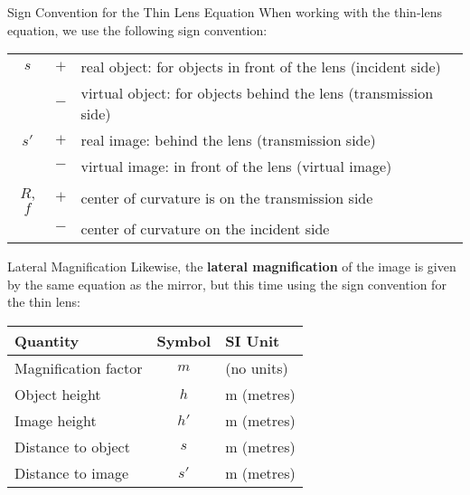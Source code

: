 \documentclass[12pt,compress,aspectratio=169]{beamer}
\newcommand{\eq}[2]{\vspace{#1}{\LARGE\begin{displaymath}#2\end{displaymath}}}
\begin{document}
\begin{frame}{Sign Convention for the Thin Lens Equation}
  When working with the thin-lens equation, we use the following sign
  convention:
  
  \eq{-.2in}{
    \boxed{\frac{1}{s}+\frac{1}{s'}=\frac{1}{f}}
  }
  \begin{center}
    \begin{tabular}{ccl}
      \hline
      $s$ & $+$ & real object: for objects in front of the lens (incident
      side) \\
      & $-$ & virtual object: for objects behind the lens (transmission side)
      \\\hline
      $s'$ & $+$ & real image: behind the lens (transmission side)\\
      & $-$ & virtual image: in front of the lens (virtual image)\\\hline
      $R$, $f$ & $+$ & center of curvature is on the transmission side\\
      & $-$ & center of curvature on the incident side\\
      \hline
    \end{tabular}
  \end{center}
\end{frame}



\begin{frame}{Lateral Magnification}
  Likewise, the  \textbf{lateral magnification} of the image is given by the
  same equation as the mirror, but this time using the sign convention for
  the thin lens:

  \eq{-.2in}{
    \boxed{m=\frac{h'}{h}=-\frac{s'}{s}}
  }
  \begin{center}
    \begin{tabular}{l|c|l}
      \rowcolor{pink}
      \textbf{Quantity} & \textbf{Symbol} & \textbf{SI Unit} \\ \hline
      Magnification factor & $m$ & (no units)\\
      Object height & $h$  & \si{\metre} (metres)\\
      Image height  & $h'$ & \si{\metre} (metres)\\
      Distance to object & $s$  & \si{\metre} (metres) \\
      Distance to image  & $s'$ & \si{\metre} (metres)
    \end{tabular}
  \end{center}
\end{frame}
\end{document}
